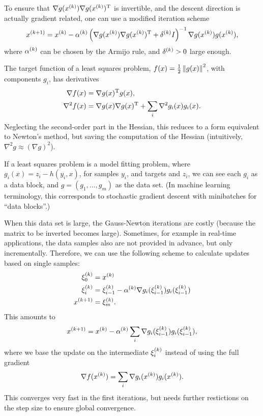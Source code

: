 \documentclass{article}
\begin{document}
\label{s:levenberg-method}

To ensure that \(\nabla g(\kth{x}) \T{\nabla g(\kth{x})}\) is invertible, and the descent direction
is actually gradient related, one can use a modified iteration scheme
\begin{equation*}
  \kth[k+1]{x} = \kth{x} - \kth{\alpha}\left(\nabla g(\kth{x}) \T{\nabla g(\kth{x})} + \kth{\delta} I\right)^{-1}
  \nabla g(\kth{x}) g(\kth{x}),
\end{equation*}
where \(\kth{\alpha}\) can be chosen by the Armijo rule, and \(\kth{\delta} > 0\) large enough.


\label{s:newton-gauss-newton}

The target function of a least squares problem, \(f(x) = \frac{1}{2}\enVert[0]{g(x)}^2\), with
components \(g_i\), has derivatives
\begin{align*}
  \nabla f(x) &= \T{\nabla g(x)} g(x), \\
  \nabla^2 f(x) &= \nabla g(x) \T{\nabla g(x)} + \sum_i \nabla^2 g_i(x) g_i(x).
\end{align*}
Neglecting the second-order part in the Hessian, this reduces to a form equivalent to Newton's
method, but saving the computation of the Hessian (intuitively, \(\nabla^2 g \approx (\nabla g)^2\)).


\label{s:incremental-gradient-methods}

If a least squares problem is a model fitting problem, where \(g_i(x) = z_i - h(y_i, x)\), for
samples \(y_i\), and targets and \(z_i\), we can see each \(g_i\) as a data block, and
\(g = (g_1, \ldots, g_m)\) as the data set.  (In machine learning terminology, this corresponds to
stochastic gradient descent with minibatches for ``data blocks''.)

When this data set is large, the Gauss-Newton iterations are costly (because the matrix to be
inverted becomes large).  Sometimes, for example in real-time applications, the data samples also
are not provided in advance, but only incrementally.  Therefore, we can use the following scheme to
calculate updates based on single samples:
\begin{align*}
  \kth{\xi}_0 &= \kth{x} \\
  \kth{\xi}_i &= \kth{\xi}_{i-1} - \kth{\alpha} \nabla g_i(\kth{\xi}_{i-1}) g_i(\kth{\xi}_{i-1}) \\
  \kth[k+1]{x} &= \kth{\xi}_m.
\end{align*}
This amounts to
\begin{equation*}
  \kth[k+1]{x} = \kth{x} - \kth{\alpha} \sum_i \nabla g_i(\kth{\xi}_{i-1}) g_i(\kth{\xi}_{i-1}),
\end{equation*}
where we base the update on the intermediate \(\kth{\xi}_i\) instead of using the full gradient
\begin{equation*}
  \nabla f(\kth{x}) = \sum_i \nabla g_i(\kth{x}) g_i(\kth{x}).
\end{equation*}
This converges very fast in the first iterations, but needs further restictions on the step size to
ensure global convergence.
\end{document}
